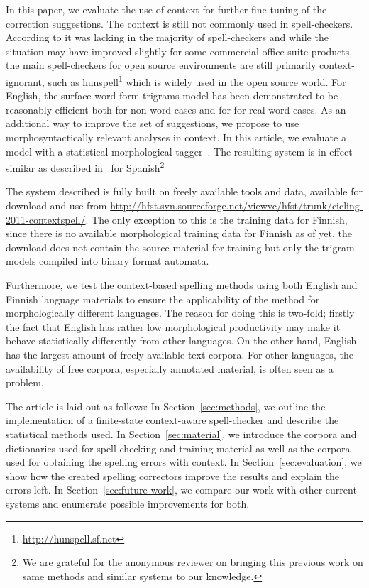 \documentclass[postprint]{flammie}
\begin{document}
In this paper, we evaluate the use of context for further fine-tuning of the
correction suggestions. The context is still not commonly used in
spell-checkers. According to \cite{kukich/1992} it was lacking in the majority
of spell-checkers and while the situation may have improved slightly for some
commercial office suite products, the main spell-checkers for open source
environments are still primarily context-ignorant, such as
hunspell\footnote{\url{http://hunspell.sf.net}} which is widely used in the
open source world.  For English, the surface word-form trigrams model has been
demonstrated to be reasonably efficient both for non-word cases
\cite{church/1991} and for for real-word cases\cite{mays/1991}. As an
additional way to improve the set of suggestions, we propose to use
morphosyntactically relevant analyses in context. In this article, we evaluate
a model with a statistical morphological tagger~\cite{silfverberg/2011}.  The
resulting system is in effect similar as described in~\cite{otero/2007} for
Spanish\footnote{We are grateful for the anonymous reviewer on bringing this
previous work on same methods and similar systems to our knowledge.}

The system described is fully built on freely available tools and data,
available for download and use from 
\url{http://hfst.svn.sourceforge.net/viewvc/hfst/trunk/cicling-2011-contextspell/}.
The only exception to this is the training data for Finnish, since there is no
available morphological training data for Finnish as of yet, the download does
not contain the source material for training but only the trigram models
compiled into binary format automata.

Furthermore, we test the context-based spelling methods using both English and
Finnish language materials to ensure the applicability of the method for
morphologically different languages. The reason for doing this is two-fold;
firstly the fact that English has rather low morphological productivity may
make it behave statistically differently from other languages. On the other
hand, English has the largest amount of freely available text corpora. For
other languages, the availability of free corpora, especially annotated
material, is often seen as a problem.

The article is laid out as follows: In Section~\ref{sec:methods}, we outline
the implementation of a finite-state context-aware spell-checker and describe
the statistical methods used.  In Section~\ref{sec:material}, we introduce the
corpora and dictionaries used for spell-checking and training material as well
as the corpora used for obtaining the spelling errors with context. In
Section~\ref{sec:evaluation}, we show how the created spelling correctors
improve the results and explain the errors left. In
Section~\ref{sec:future-work}, we compare our work with other current systems
and enumerate possible improvements for both.
\end{document}
